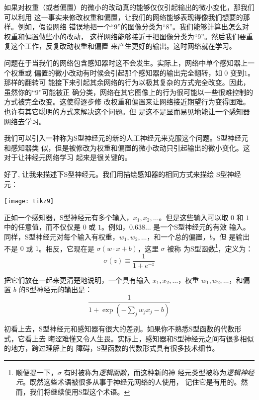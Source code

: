 如果对权重（或者偏置）的微小的改动真的能够仅仅引起输出的微小变化，那我们可以利用
这一事实来修改权重和偏置，让我们的网络能够表现得像我们想要的那样。例如，假设网络
错误地把一个“9”的图像分类为“8”。我们能够计算出怎么对权重和偏置做些小的改动，
这样网络能够接近于把图像分类为“9”。然后我们要重复这个工作，反复改动权重和偏置
来产生更好的输出。这时网络就在学习。

问题在于当我们的网络包含感知器时这不会发生。实际上，网络中单个感知器上一个权重或
偏置的微小改动有时候会引起那个感知器的输出完全翻转，如 $0$ 变到$1$。那样的翻转可
能接下来引起其余网络的行为以极其复杂的方式完全改变。因此，虽然你的“9”可能被正
确分类，网络在其它图像上的行为很可能以一些很难控制的方式被完全改变。这使得逐步修
改权重和偏置来让网络接近期望行为变得困难。也许有其它聪明的方式来解决这个问题。但
是这不是显而易见地能让一个感知器网络去学习。

我们可以引入一种称为S型神经元的新的人工神经元来克服这个问题。S型神经元和感知器类
似，但是被修改为权重和偏置的微小改动只引起输出的微小变化。这对于让神经元网络学习
起来是很关键的。

好了, 让我来描述下S型神经元。我们用描绘感知器的相同方式来描绘
S型神经元：
\begin{center}
  \texttt{[image: tikz9]}
\end{center}

正如一个感知器，S型神经元有多个输入，$x_1,x_2,\ldots$。但是这些输入可以取 $0$ 和
$1$ 中的任意值，而不仅仅是 $0$ 或 $1$。例如，$0.638\ldots$ 是一个S型神经元的有效
输入。同样，S型神经元对每个输入有权重，$w_1,w_2,\ldots$，和一个总的偏置，$b$。但
是输出不是 $0$ 或 $1$。相反，它现在是 $\sigma(w \cdot x+b)$，这里 $\sigma$ 被称
为S型函数\footnote{顺便提一下，$\sigma$ 有时被称为\emph{逻辑函数}，而这种新的神
  经元类型被称为\emph{逻辑神经元}。既然这些术语被很多从事于神经元网络的人使用，
  记住它是有用的。然而，我们将继续使用S型这个术语。}，定义为：
\begin{equation}
  \sigma(z) \equiv \frac{1}{1+e^{-z}}
  \label{eq:3}\tag{3}
\end{equation}

把它们放在一起来更清楚地说明，一个具有输入 $x_1,x_2,\ldots$，权重
$w_1,w_2,\ldots$，和偏置 $b$ 的S型神经元的输出是：
\begin{equation}
  \frac{1}{1+\exp(-\sum_j w_j x_j-b)}
  \label{eq:4}\tag{4}
\end{equation}

初看上去，S型神经元和感知器有很大的差别。如果你不熟悉S型函数的代数形式，它看上去
晦涩难懂又令人生畏。实际上，感知器和S型神经元之间有很多相似的地方，跨过理解上的
障碍，S型函数的代数形式具有很多技术细节。

